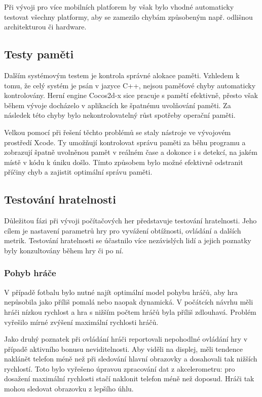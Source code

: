 \documentclass[thesis=B,czech,hidelinks]{FITthesis}[2012/06/26] %
\begin{document}
Při vývoji pro více mobilních platforem by však bylo vhodné automaticky testovat všechny platformy, aby se zamezilo chybám způsobeným např. odlišnou architekturou či hardware.

\subsection{Testy paměti}

Dalším systémovým testem je kontrola správné alokace paměti. Vzhledem k tomu, že celý systém je psán v jazyce C++, nejsou paměťové chyby automaticky kontrolovány. Herní engine Cocos2d-x sice pracuje s pamětí efektivně, přesto však během vývoje docházelo v aplikacích ke špatnému uvolňování paměti. Za následek této chyby bylo nekontrolovatelný růst spotřeby operační paměti.

Velkou pomocí při řešení těchto problémů se staly nástroje ve vývojovém prostředí Xcode. Ty umožňují kontrolovat správu paměti za běhu programu a zobrazují špatně uvolněnou pamět v reálném čase a dokonce i s detekcí, na jakém místě v kódu k úniku došlo. Tímto způsobem bylo možné efektivně odstranit příčiny chyb a zajistit optimální správu paměti.

\subsection{Testování hratelnosti}

Důležitou fázi při vývoji počítačových her představuje testování hratelnosti. Jeho cílem je nastavení parametrů hry pro vyvážení obtížnosti, ovládání a dalších metrik. Testování hratelnosti se účastnilo více nezávislých lidí a jejich poznatky byly konzultovány během hry či po ní.

\subsubsection{Pohyb hráče}

V případě fotbalu bylo nutné najít optimální model pohybu hráčů, aby hra nepůsobila jako příliš pomalá nebo naopak dynamická. V počátcích návrhu měli hráči nízkou rychlost a hra s nižším počtem hráčů byla příliš zdlouhavá. Problém vyřešilo mírné zvýšení maximální rychlosti  hráčů.

Jako druhý poznatek při ovládání hráči reportovali nepohodlné ovládání hry v případě aktivního bonusu neviditelnosti. Aby viděli na displej, měli tendence naklánět telefon méně než při sledování hlavní obrazovky a dosahovali tak nižších rychlostí. Toto bylo vyřešeno úpravou zpracování dat z akcelerometru: pro dosažení maximální rychlosti stačí naklonit telefon méně než doposud. Hráči tak mohou sledovat obrazovku z lepšího úhlu.
\end{document}
